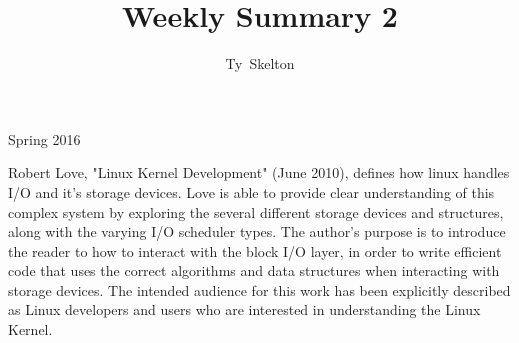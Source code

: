 \documentclass[10pt,draftclsnofoot,onecolumn]{IEEEtran}
\begin{document}
\singlespacing
\title{Weekly Summary 2}

\author{Ty~Skelton}

%
{Spring 2016}

\maketitle
\IEEEpeerreviewmaketitle

Robert Love, "Linux Kernel Development" (June 2010), defines how linux handles I/O and it's storage devices.
Love is able to provide clear understanding of this complex system by exploring the several different storage devices and structures, along with the varying I/O scheduler types.
The author's purpose is to introduce the reader to how to interact with the block I/O layer, in order to write efficient code that uses the correct algorithms and data structures when interacting with storage devices. 
The intended audience for this work has been explicitly described as Linux developers and users who are interested in understanding the Linux Kernel.
\end{document}

